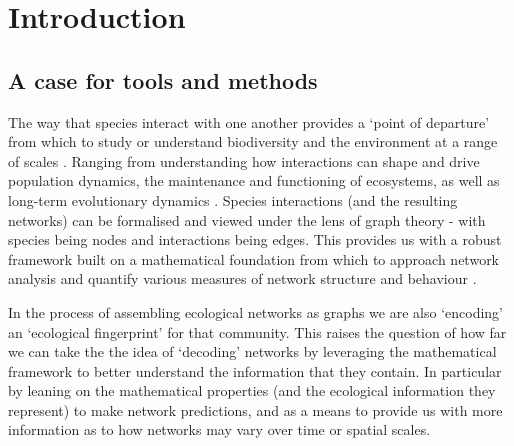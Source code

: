 \anglais
\chapter*{Introduction}

\section{A case for tools and methods}

The way that species interact with one another provides a `point of
departure' from which to study or understand biodiversity and the
environment at a range of scales \cite{Jordano2016ChaEco}. Ranging from
understanding how interactions can shape and drive population dynamics,
the maintenance and functioning of ecosystems, as well as long-term
evolutionary dynamics \cite{Landi2018ComSta, Albrecht2018PlaAni}.
Species interactions (and the resulting networks) can be formalised
and viewed under the lens of graph theory \cite{Dale2010GraSpa} - with
species being nodes and interactions being edges. This provides us with
a robust framework built on a mathematical foundation from which to approach
network analysis and quantify various measures of network structure and
behaviour \cite{Delmas2019AnaEco}.

In the process of assembling ecological networks as graphs we are also
`encoding' an `ecological fingerprint' for that community. This raises
the question of how far we can take the the idea of `decoding' networks
by leveraging the mathematical framework to better understand the
information that they contain. In particular by leaning on the
mathematical properties (and the ecological information they represent)
to make network predictions, and as a means to provide us with more
information as to how networks may vary over time or spatial scales.

